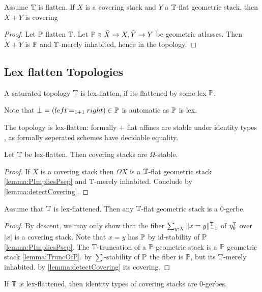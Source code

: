 \begin{lemma}
	Assume $\mathbb{T}$ is flatten.
	If $X$ is a covering stack and $Y$ a $\mathbb{T}$-flat geometric stack, then $X + Y$ is covering
\end{lemma}
\begin{proof}
	Let $\mathbb{P}$ flatten $\mathbb{T}$.
	Let ${\mathbb{P}} \ni \tilde X \to X, \tilde Y \to Y$ be geometric atlasses. Then $\tilde X+ \tilde Y$ is $\mathbb{P}$ and ${\mathbb{T}}$-merely inhabited, hence in the topology.
\end{proof}

\subsection{Lex flatten Topologies}


\begin{definition}
	A saturated topology $\mathbb{T}$ is lex-flatten, if its flattened by some lex $\mathbb{P}$. %
\end{definition}
Note that $\bot = (left =_{1+1} right) \in \mathbb{P}$ is automatic as $\mathbb{P}$ is lex.

\begin{example}
	The \etale topology is lex-flatten:
	formally \etale $+$ flat affines are stable under identity types , as formally \etale seperated schemes have decidable equality.  %
\end{example}

\begin{prop}{\label{prop:LexflattenOmegaStable}}
	Let $\mathbb{T}$ be lex-flatten. Then covering stacks are $\Omega$-stable. %
\end{prop}
\begin{proof}
	If $X$ is a covering stack then $\Omega X$ is a $\mathbb{T}$-flat geometric stack \ref{lemma:PImpliesPsep} and $\mathbb{T}$-merely inhabited. Conclude by  \ref{lemma:detectCovering}.
\end{proof}
\begin{lemma}
	Assume that $\mathbb{T}$ is lex-flattened. Then any $\mathbb{T}$-flat geometric stack is a 0-gerbe.
\end{lemma}
\begin{proof}
	By descent, we may only show that the fiber $\sum_{y: X} \|x = y\|_{-1}^{\mathbb{T}}$ of $\eta_0^{\mathbb{T}}$ over $|x|$ is a covering stack. Note that $x = y$ has $\mathbb{P}$ by id-stability of $\mathbb{P}$ \ref{lemma:PImpliesPsep}. The $\mathbb{T}$-truncation of a $\mathbb{P}$-geometric stack is a $\mathbb{P}$ geometric stack \ref{lemma:TruncOfP}. by $\sum$-stability of $\mathbb{P}$ the fiber is $\mathbb{P}$, but its $\mathbb{T}$-merely inhabited. by \ref{lemma:detectCovering} its covering.
\end{proof}
\begin{corollary}
	If $\mathbb{T}$ is lex-flattened, then identity types of covering stacks are 0-gerbes.
\end{corollary}
